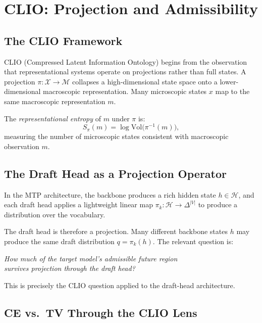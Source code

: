 \documentclass[11pt, a4paper, openany]{book}
\theoremstyle{plain}
\theoremstyle{definition}
\theoremstyle{remark}
\newcommand{\Vol}{\mathrm{Vol}}
\begin{document}
\chapter{CLIO: Projection and Admissibility}
\label{ch:clio}

\section{The CLIO Framework}

CLIO (Compressed Latent Information Ontology) begins from the observation
that representational systems operate on projections rather than full states.
A projection $\pi : \mathcal{X} \to \mathcal{M}$ collapses a high-dimensional
state space onto a lower-dimensional macroscopic representation.
Many microscopic states $x$ map to the same macroscopic representation $m$.

The \emph{representational entropy} of $m$ under $\pi$ is:
\[
  S_\pi(m) = \log \Vol\!\bigl(\pi^{-1}(m)\bigr),
\]
measuring the number of microscopic states consistent with macroscopic
observation $m$.

\section{The Draft Head as a Projection Operator}

In the MTP architecture, the backbone produces a rich hidden state $h \in \mathcal{H}$,
and each draft head applies a lightweight linear map $\pi_k : \mathcal{H} \to \Delta^{|V|}$
to produce a distribution over the vocabulary.

The draft head is therefore a projection.
Many different backbone states $h$ may produce the same draft distribution
$q = \pi_k(h)$.
The relevant question is:

\begin{center}
  \emph{How much of the target model's admissible future region\\
  survives projection through the draft head?}
\end{center}

This is precisely the CLIO question applied to the draft-head architecture.

\section{CE vs.\ TV Through the CLIO Lens}
\end{document}
